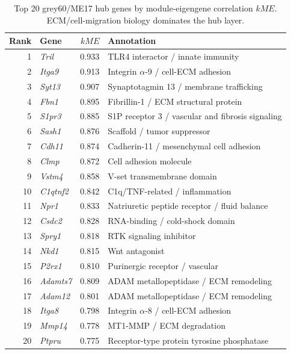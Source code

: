 \documentclass[11pt]{article}
\newcommand{\gene}[1]{\textit{#1}}
\begin{document}
\begin{table}[h]
\centering\small
\begin{tabular}{rlrl}
\toprule
Rank & Gene & $kME$ & Annotation \\
\midrule
1 & \gene{Tril} & 0.933 & TLR4 interactor / innate immunity \\
2 & \gene{Itga9} & 0.913 & Integrin $\alpha$-9 / cell-ECM adhesion \\
3 & \gene{Syt13} & 0.907 & Synaptotagmin 13 / membrane trafficking \\
4 & \gene{Fbn1} & 0.895 & Fibrillin-1 / ECM structural protein \\
5 & \gene{S1pr3} & 0.885 & S1P receptor 3 / vascular and fibrosis signaling \\
6 & \gene{Sash1} & 0.876 & Scaffold / tumor suppressor \\
7 & \gene{Cdh11} & 0.874 & Cadherin-11 / mesenchymal cell adhesion \\
8 & \gene{Clmp} & 0.872 & Cell adhesion molecule \\
9 & \gene{Vstm4} & 0.858 & V-set transmembrane domain \\
10 & \gene{C1qtnf2} & 0.842 & C1q/TNF-related / inflammation \\
11 & \gene{Npr1} & 0.833 & Natriuretic peptide receptor / fluid balance \\
12 & \gene{Csdc2} & 0.828 & RNA-binding / cold-shock domain \\
13 & \gene{Spry1} & 0.818 & RTK signaling inhibitor \\
14 & \gene{Nkd1} & 0.815 & Wnt antagonist \\
15 & \gene{P2rx1} & 0.810 & Purinergic receptor / vascular \\
16 & \gene{Adamts7} & 0.809 & ADAM metallopeptidase / ECM remodeling \\
17 & \gene{Adam12} & 0.801 & ADAM metallopeptidase / ECM remodeling \\
18 & \gene{Itga8} & 0.798 & Integrin $\alpha$-8 / cell-ECM adhesion \\
19 & \gene{Mmp14} & 0.778 & MT1-MMP / ECM degradation \\
20 & \gene{Ptpru} & 0.775 & Receptor-type protein tyrosine phosphatase \\
\bottomrule
\end{tabular}
\caption{Top 20 grey60/ME17 hub genes by module-eigengene correlation $kME$. ECM/cell-migration biology dominates the hub layer.}
\label{tab:hubs}
\end{table}
\end{document}
